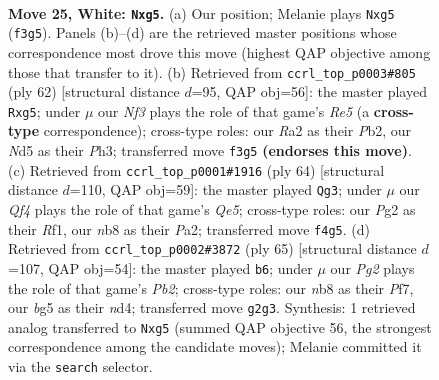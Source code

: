 \documentclass[11pt]{article}
\begin{document}
\clearpage

\begin{figure}[p]\centering
\begin{subfigure}{0.46\textwidth}\centering
\resizebox{\linewidth}{!}{%
\newchessgame
\chessboard[
  setfen={rn1qk2r/8/1p1p1p2/pPpN2b1/4PQ2/5N1P/RP4P1/2K4R w q - 2 25},
  showmover=false,
  pgfstyle=straightmove, color=movearrow, markmove={f3-g5}
]}
\caption{}
\end{subfigure}\hfill
\begin{subfigure}{0.46\textwidth}\centering
\resizebox{\linewidth}{!}{%
\newchessgame
\chessboard[
  setfen={2b1Nr1k/5pqp/p2r4/1p2R1p1/2p3PQ/P4N1P/1P3P2/6K1 w - - 0 32},
  showmover=false,
  pgfstyle=straightmove, color=movearrow, markmove={e5-g5}
]}
\caption{}
\end{subfigure}
\\[4pt]
\begin{subfigure}{0.46\textwidth}\centering
\resizebox{\linewidth}{!}{%
\newchessgame
\chessboard[
  setfen={3q2k1/6n1/p2r1pp1/3NQ2p/2P1p3/1P3b2/PK5P/5RR1 w - - 0 33},
  showmover=false,
  pgfstyle=straightmove, color=movearrow, markmove={e5-g3}
]}
\caption{}
\end{subfigure}\hfill
\begin{subfigure}{0.46\textwidth}\centering
\resizebox{\linewidth}{!}{%
\newchessgame
\chessboard[
  setfen={4r1k1/1p3pp1/p6p/2Rpn3/3Nq3/P3PrPP/1P1R1PQ1/6K1 b - - 13 33},
  showmover=false,
  pgfstyle=straightmove, color=movearrow, markmove={b7-b6}
]}
\caption{}
\end{subfigure}
\caption{\textbf{Move 25, White: \texttt{Nxg5}.} (a) Our position; Melanie plays \texttt{Nxg5} (\texttt{f3g5}). Panels (b)--(d) are the retrieved master positions whose correspondence most drove this move (highest QAP objective among those that transfer to it). (b) Retrieved from \texttt{ccrl\_top\_p0003\#805} (ply 62) [structural distance $d$=95, QAP obj=56]: the master played \texttt{Rxg5}; under $\mu$ our \emph{Nf3} plays the role of that game's \emph{Re5} (a \textbf{cross-type} correspondence); cross-type roles: our \emph{R}a2 as their \emph{P}b2, our \emph{N}d5 as their \emph{P}h3; transferred move \texttt{f3g5} \textbf{(endorses this move)}. (c) Retrieved from \texttt{ccrl\_top\_p0001\#1916} (ply 64) [structural distance $d$=110, QAP obj=59]: the master played \texttt{Qg3}; under $\mu$ our \emph{Qf4} plays the role of that game's \emph{Qe5}; cross-type roles: our \emph{P}g2 as their \emph{R}f1, our \emph{n}b8 as their \emph{P}a2; transferred move \texttt{f4g5}. (d) Retrieved from \texttt{ccrl\_top\_p0002\#3872} (ply 65) [structural distance $d$=107, QAP obj=54]: the master played \texttt{b6}; under $\mu$ our \emph{Pg2} plays the role of that game's \emph{Pb2}; cross-type roles: our \emph{n}b8 as their \emph{P}f7, our \emph{b}g5 as their \emph{n}d4; transferred move \texttt{g2g3}. Synthesis: 1 retrieved analog transferred to \texttt{Nxg5} (summed QAP objective 56, the strongest correspondence among the candidate moves); Melanie committed it via the \texttt{search} selector.}
\label{fig:thought-m48}
\end{figure}
\end{document}
